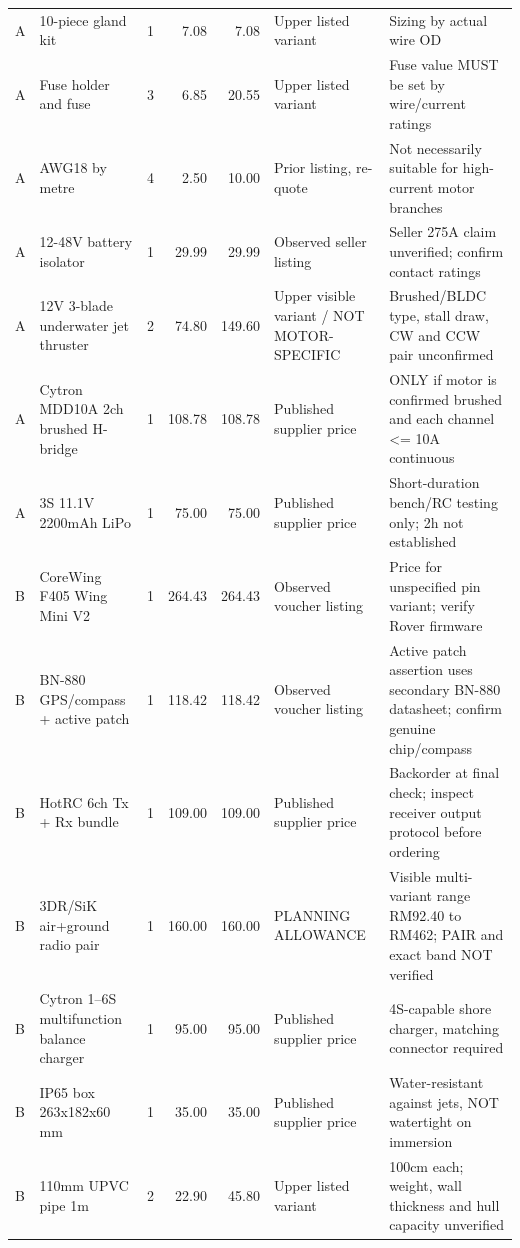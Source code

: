 \begin{longtable}{L{12mm}L{47mm}r r r L{31mm}L{36mm}}
A & 10-piece gland kit \cite{gland} & 1 & 7.08 & 7.08 & Upper listed variant & Sizing by actual wire OD \\
A & Fuse holder and fuse \cite{fuse} & 3 & 6.85 & 20.55 & Upper listed variant & Fuse value MUST be set by wire/current ratings \\
A & AWG18 by metre \cite{wire} & 4 & 2.50 & 10.00 & Prior listing, re-quote & Not necessarily suitable for high-current motor branches \\
A & 12-48V battery isolator \cite{kill} & 1 & 29.99 & 29.99 & Observed seller listing & Seller 275A claim unverified; confirm contact ratings \\
A & 12V 3-blade underwater jet thruster \cite{jetShop} & 2 & 74.80 & 149.60 & Upper visible variant / NOT MOTOR-SPECIFIC & Brushed/BLDC type, stall draw, CW and CCW pair unconfirmed \\
A & Cytron MDD10A 2ch brushed H-bridge \cite{mdd10} & 1 & 108.78 & 108.78 & Published supplier price & ONLY if motor is confirmed brushed and each channel <= 10A continuous \\
A & 3S 11.1V 2200mAh LiPo \cite{bat22} & 1 & 75.00 & 75.00 & Published supplier price & Short-duration bench/RC testing only; 2h not established \\
B & CoreWing F405 Wing Mini V2 \cite{coreShop} & 1 & 264.43 & 264.43 & Observed voucher listing & Price for unspecified pin variant; verify Rover firmware \\
B & BN-880 GPS/compass + active patch \cite{bnShop} & 1 & 118.42 & 118.42 & Observed voucher listing & Active patch assertion uses secondary BN-880 datasheet; confirm genuine chip/compass \\
B & HotRC 6ch Tx + Rx bundle \cite{hotrc} & 1 & 109.00 & 109.00 & Published supplier price & Backorder at final check; inspect receiver output protocol before ordering \\
B & 3DR/SiK air+ground radio pair \cite{radioShop} & 1 & 160.00 & 160.00 & PLANNING ALLOWANCE & Visible multi-variant range RM92.40 to RM462; PAIR and exact band NOT verified \\
B & Cytron 1--6S multifunction balance charger \cite{charger4} & 1 & 95.00 & 95.00 & Published supplier price & 4S-capable shore charger, matching connector required \\
B & IP65 box 263x182x60 mm \cite{box} & 1 & 35.00 & 35.00 & Published supplier price & Water-resistant against jets, NOT watertight on immersion \\
B & 110mm UPVC pipe 1m \cite{pipe} & 2 & 22.90 & 45.80 & Upper listed variant & 100cm each; weight, wall thickness and hull capacity unverified \\

\end{longtable}
